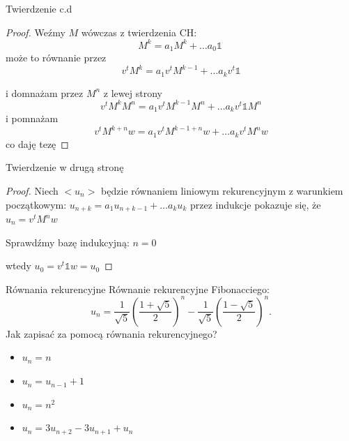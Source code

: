 \documentclass[handout]{beamer}
\theoremstyle{definition}
\theoremstyle{named}
\begin{document}
\begin{frame}{Twierdzenie c.d}

\begin{proof}
    Weźmy $M$ wówczas z twierdzenia CH: 
    \begin{equation}
        M^{k} =  a_1 M^{k} + \ldots a_0 \mathbb{1} \
    \end{equation}
    może to równanie przez 
    \begin{equation}
        v^{t}M^{k} = a_1 v^{t} M^{k-1} + \ldots a_k v^{t} \mathbb{1} 
    \end{equation} 


i domnażam przez $M^{n}$ z lewej strony 
      \begin{equation}
          v^{t}M^{k} M^{n} = a_1 v^{t} M^{k-1} M^{n} + \ldots a_k v^{t} \mathbb{1} M^{n}
      \end{equation}
      i pomnażam 
      $$ v^{t}M^{k + n} w = a_1 v^{t} M^{k-1 + n}w + \ldots a_k v^{t} M^{n}w $$ 
      co daję tezę
\end{proof}
\end{frame}

\begin{frame}{Twierdzenie w drugą stronę}
\begin{proof}
    Niech $<u_n>$ będzie równaniem liniowym rekurencyjnym z warunkiem początkowym:
    $u_{n+k} = a_1 u_{n+k-1} + \ldots a_{k} u_{k}$
    przez indukcje pokazuje się, że $u_{n} = v^{t}M^{n}w $
    
    Sprawdźmy bazę indukcyjną:
    $n=0$
    
    wtedy $u_{0} = v^{t} \mathbb{1} w = u_0$
    
\end{proof}
\end{frame}



\begin{frame}{Równania rekurencyjne}
Równanie rekurencyjne Fibonacciego: 
$$
{\displaystyle u_{n}={\frac {1}{\sqrt {5}}}\left({\frac {1+{\sqrt {5}}}{2}}\right)^{n}-{\frac {1}{\sqrt {5}}}\left({\frac {1-{\sqrt {5}}}{2}}\right)^{n}.}
$$
 Jak zapisać za pomocą równania rekurencyjnego? 
\begin{itemize}
    \item  $u_n = n$
    \pause 
    \item $u_n = u_{n-1} + 1$
    \pause
    \item  $u_n = n^{2}$
    \pause
    \item $u_n = 3 u_{n+2} - 3u_{n+1} + u_n$

\end{itemize}

\end{frame}
\end{document}
